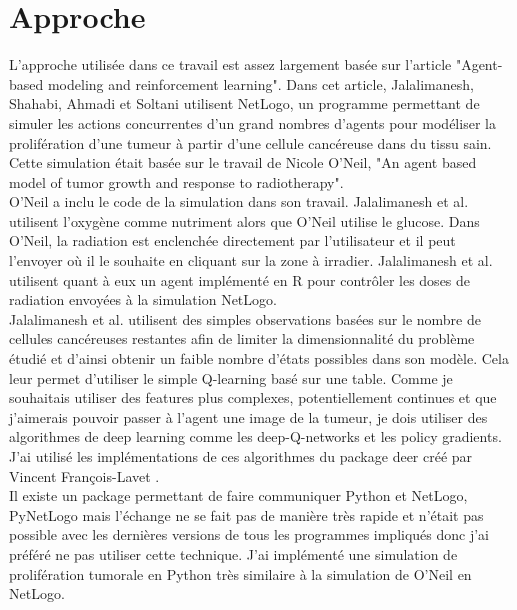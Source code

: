 \documentclass[12pt]{article}
\begin{document}
\section{Approche}

L'approche utilisée dans ce travail est assez largement basée sur l'article "Agent-based modeling and reinforcement learning"\citep{jalalimanesh}. Dans cet article, Jalalimanesh, Shahabi, Ahmadi et Soltani utilisent NetLogo, un programme permettant de simuler les actions concurrentes d'un grand nombres d'agents pour modéliser la prolifération d'une tumeur à partir d'une cellule cancéreuse dans du tissu sain. Cette simulation était basée sur le travail de Nicole O'Neil, "An agent based model of tumor growth and response to radiotherapy"\citep{oneil}.\\

O'Neil a inclu le code de la simulation dans son travail. Jalalimanesh et al. utilisent l'oxygène comme nutriment alors que O'Neil utilise le glucose. Dans O'Neil, la radiation est enclenchée directement par l'utilisateur et il peut l'envoyer où il le souhaite en cliquant sur la zone à irradier. Jalalimanesh et al. utilisent quant à eux un agent implémenté en R pour contrôler les doses de radiation envoyées à la simulation NetLogo. \\

Jalalimanesh et al. utilisent des simples observations basées sur le nombre de cellules cancéreuses restantes afin de limiter la dimensionnalité du problème étudié et d'ainsi obtenir un faible nombre d'états possibles dans son modèle. Cela leur permet d'utiliser le simple Q-learning basé sur une table. Comme je souhaitais utiliser des features plus complexes, potentiellement continues et que j'aimerais pouvoir passer à l'agent une image de la tumeur, je dois utiliser des algorithmes de deep learning comme les deep-Q-networks et les policy gradients. J'ai utilisé les implémentations de ces algorithmes du package deer créé par Vincent François-Lavet \citep{deer}.\\

Il existe un package permettant de faire communiquer Python et NetLogo, PyNetLogo mais l'échange ne se fait pas de manière très rapide et n'était pas possible avec les dernières versions de tous les programmes impliqués donc j'ai préféré ne pas utiliser cette technique. J'ai implémenté une simulation de prolifération tumorale en Python très similaire à la simulation de O'Neil en NetLogo.
\end{document}
